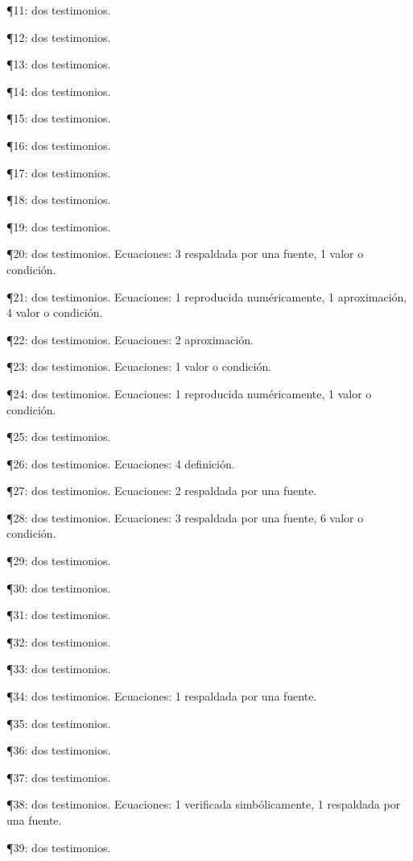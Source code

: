 \documentclass{book}
\begin{document}
\noindent ¶11: dos testimonios.

\noindent ¶12: dos testimonios.

\noindent ¶13: dos testimonios.

\noindent ¶14: dos testimonios.

\noindent ¶15: dos testimonios.

\noindent ¶16: dos testimonios.

\noindent ¶17: dos testimonios.

\noindent ¶18: dos testimonios.

\noindent ¶19: dos testimonios.

\noindent ¶20: dos testimonios. Ecuaciones: 3 respaldada por una fuente, 1 valor o condición.

\noindent ¶21: dos testimonios. Ecuaciones: 1 reproducida numéricamente, 1 aproximación, 4 valor o condición.

\noindent ¶22: dos testimonios. Ecuaciones: 2 aproximación.

\noindent ¶23: dos testimonios. Ecuaciones: 1 valor o condición.

\noindent ¶24: dos testimonios. Ecuaciones: 1 reproducida numéricamente, 1 valor o condición.

\noindent ¶25: dos testimonios.

\noindent ¶26: dos testimonios. Ecuaciones: 4 definición.

\noindent ¶27: dos testimonios. Ecuaciones: 2 respaldada por una fuente.

\noindent ¶28: dos testimonios. Ecuaciones: 3 respaldada por una fuente, 6 valor o condición.

\noindent ¶29: dos testimonios.

\noindent ¶30: dos testimonios.

\noindent ¶31: dos testimonios.

\noindent ¶32: dos testimonios.

\noindent ¶33: dos testimonios.

\noindent ¶34: dos testimonios. Ecuaciones: 1 respaldada por una fuente.

\noindent ¶35: dos testimonios.

\noindent ¶36: dos testimonios.

\noindent ¶37: dos testimonios.

\noindent ¶38: dos testimonios. Ecuaciones: 1 verificada simbólicamente, 1 respaldada por una fuente.

\noindent ¶39: dos testimonios.
\end{document}
